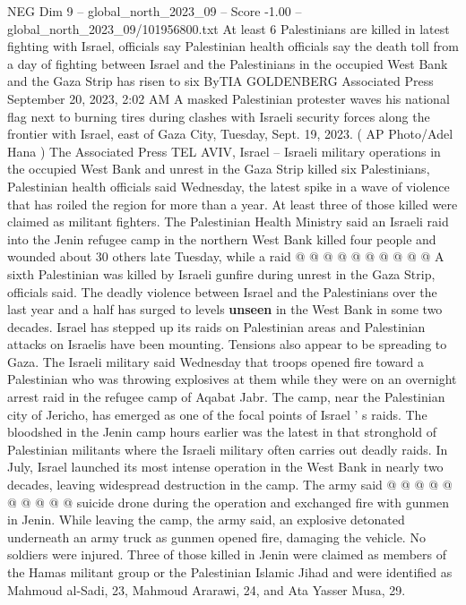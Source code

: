 \begin{textsample}{NEG Dim 9 – global\_north\_2023\_09 – Score -1.00 – global\_north\_2023\_09/101956800.txt}  \label{ex:f9_neg_043}
At least 6 Palestinians are killed in latest fighting with Israel, officials say Palestinian health officials say the death toll from a day of fighting between Israel and the Palestinians in the occupied West Bank and the Gaza Strip has risen to six ByTIA GOLDENBERG Associated Press September 20, 2023, 2:02 AM A masked Palestinian protester waves his national flag next to burning tires during clashes with Israeli security forces along the frontier with Israel, east of Gaza City, Tuesday, Sept. 19, 2023. ( AP Photo/Adel Hana ) The Associated Press TEL AVIV, Israel -- Israeli military operations in the occupied West Bank and unrest in the Gaza Strip killed six Palestinians, Palestinian health officials said Wednesday, the latest spike in a wave of violence that has roiled the region for more than a year.
At least three of those killed were claimed as militant fighters.
The Palestinian Health Ministry said an Israeli raid into the Jenin refugee camp in the northern West Bank killed four people and wounded about 30 others late Tuesday, while a raid @ @ @ @ @ @ @ @ @ @ A sixth Palestinian was killed by Israeli gunfire during unrest in the Gaza Strip, officials said.
The deadly violence between Israel and the Palestinians over the last year and a half has surged to levels \textbf{unseen} in the West Bank in some two decades.
Israel has stepped up its raids on Palestinian areas and Palestinian attacks on Israelis have been mounting.
Tensions also appear to be spreading to Gaza.
The Israeli military said Wednesday that troops opened fire toward a Palestinian who was throwing explosives at them while they were on an overnight arrest raid in the refugee camp of Aqabat Jabr.
The camp, near the Palestinian city of Jericho, has emerged as one of the focal points of Israel ' s raids.
The bloodshed in the Jenin camp hours earlier was the latest in that stronghold of Palestinian militants where the Israeli military often carries out deadly raids.
In July, Israel launched its most intense operation in the West Bank in nearly two decades, leaving widespread destruction in the camp.
The army said @ @ @ @ @ @ @ @ @ @ suicide drone during the operation and exchanged fire with gunmen in Jenin.
While leaving the camp, the army said, an explosive detonated underneath an army truck as gunmen opened fire, damaging the vehicle.
No soldiers were injured.
Three of those killed in Jenin were claimed as members of the Hamas militant group or the Palestinian Islamic Jihad and were identified as Mahmoud al-Sadi, 23, Mahmoud Ararawi, 24, and Ata Yasser Musa, 29.

\end{textsample}
